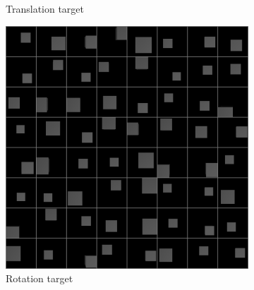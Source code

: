 \documentclass[10pt,a4paper]{article}
\begin{document}
\begin{figure}[!ht]
\begin{subfigure}{0.49\textwidth}
        \caption{Translation target}
        \label{cube_tt}
    \end{subfigure}
    \begin{subfigure}{0.49\textwidth}
        \centering	
        \includegraphics[width=\textwidth]{cube_target1.png}
        \caption{Rotation target}
        \label{cube_rt}
    \end{subfigure}
    \caption{} \label{cube_images}
\end{figure}
\end{document}
